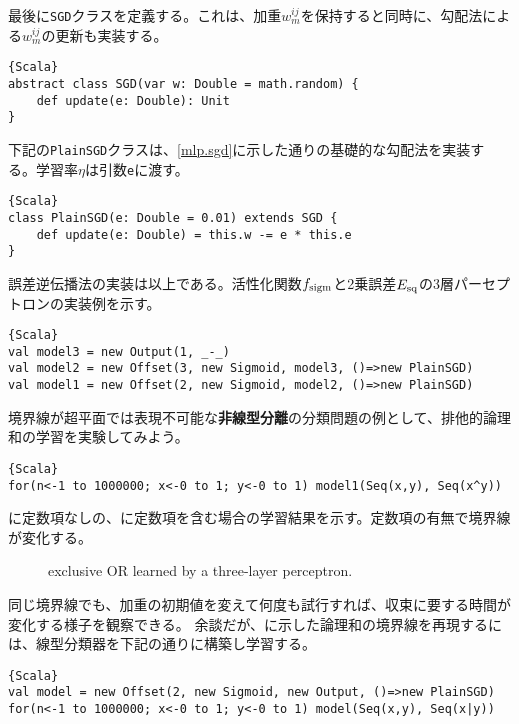 \documentclass[10pt,a4paper]{book}
\begin{document}
最後に\texttt{SGD}クラスを定義する。これは、加重$w_m^{ij}$を保持すると同時に、勾配法による$w_m^{ij}$の更新も実装する。

\begin{Verbatim}{Scala}
abstract class SGD(var w: Double = math.random) {
	def update(e: Double): Unit
}
\end{Verbatim}

下記の\texttt{PlainSGD}クラスは、\eqref{mlp.sgd}に示した通りの基礎的な勾配法を実装する。学習率$\eta$は引数\texttt{e}に渡す。

\begin{Verbatim}{Scala}
class PlainSGD(e: Double = 0.01) extends SGD {
	def update(e: Double) = this.w -= e * this.e
}
\end{Verbatim}

誤差逆伝播法の実装は以上である。活性化関数$f_\mathrm{sigm}$と2乗誤差$E_\mathrm{sq}$の3層パーセプトロンの実装例を示す。

\begin{Verbatim}{Scala}
val model3 = new Output(1, _-_)
val model2 = new Offset(3, new Sigmoid, model3, ()=>new PlainSGD)
val model1 = new Offset(2, new Sigmoid, model2, ()=>new PlainSGD)
\end{Verbatim}

境界線が超平面では表現不可能な\textbf{非線型分離}の分類問題の例として、排他的論理和の学習を実験してみよう。

\begin{Verbatim}{Scala}
for(n<-1 to 1000000; x<-0 to 1; y<-0 to 1) model1(Seq(x,y), Seq(x^y))
\end{Verbatim}

に定数項なしの、に定数項を含む場合の学習結果を示す。定数項の有無で境界線が変化する。

\begin{figure}[h]
\centering
{}
\caption{exclusive OR learned by a three-layer perceptron.\label{fig:mlp.split}}
\end{figure}

同じ境界線でも、加重の初期値を変えて何度も試行すれば、収束に要する時間が変化する様子を観察できる。
余談だが、に示した論理和の境界線を再現するには、線型分類器を下記の通りに構築し学習する。

\begin{Verbatim}{Scala}
val model = new Offset(2, new Sigmoid, new Output, ()=>new PlainSGD)
for(n<-1 to 1000000; x<-0 to 1; y<-0 to 1) model(Seq(x,y), Seq(x|y))
\end{Verbatim}
\end{document}
